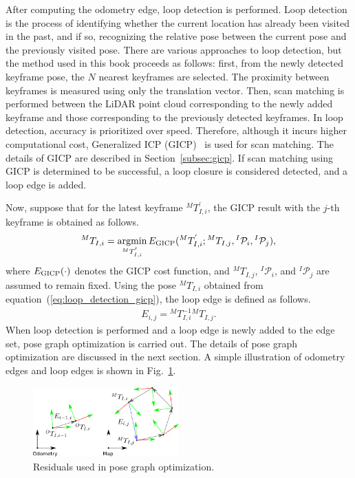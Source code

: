 After computing the odometry edge, loop detection is performed.
Loop detection is the process of identifying whether the current location has already been visited in the past, and if so, recognizing the relative pose between the current pose and the previously visited pose.
There are various approaches to loop detection, but the method used in this book proceeds as follows: first, from the newly detected keyframe pose, the $N$ nearest keyframes are selected.
The proximity between keyframes is measured using only the translation vector.
Then, scan matching is performed between the LiDAR point cloud corresponding to the newly added keyframe and those corresponding to the previously detected keyframes.
In loop detection, accuracy is prioritized over speed.
Therefore, although it incurs higher computational cost, Generalized ICP (GICP)~\cite{SegalRSS2009GICP} is used for scan matching.
The details of GICP are described in Section~\ref{subsec:gicp}.
If scan matching using GICP is determined to be successful, a loop closure is considered detected, and a loop edge is added.

Now, suppose that for the latest keyframe ${}^{M}T_{I,i}^{'}$, the GICP result with the $j$-th keyframe is obtained as follows.
%
\begin{align}
  {}^{M}T_{I, i} = \mathop{\rm argmin}\limits_{ {}^{M}T_{I, i}^{'} } E_{\rm GICP}({}^{M}T_{I, i}^{'}; {}^{M}T_{I, j}, {}^{I}\mathcal{P}_{i}, {}^{I}\mathcal{P}_{j}),
  \label{eq:loop_detection_gicp}
\end{align}
%
where $E_{\rm GICP}(\cdot)$ denotes the GICP cost function, and ${}^{M}T_{I, j}$, ${}^{I}\mathcal{P}_{i}$, and ${}^{I}\mathcal{P}_{j}$ are assumed to remain fixed.
Using the pose ${}^{M}T_{I, i}$ obtained from equation~(\ref{eq:loop_detection_gicp}), the loop edge is defined as follows.
%
\begin{align}
  E_{i, j} = {}^{M}T_{I, i}^{-1} {}^{M}T_{I, j}.
  \label{eq:loop_edge}
\end{align}
%
When loop detection is performed and a loop edge is newly added to the edge set, pose graph optimization is carried out.
The details of pose graph optimization are discussed in the next section.
A simple illustration of odometry edges and loop edges is shown in Fig.~\ref{fig:graph_slam_residuals}.

\begin{figure}[!t]
  \centering
  \includegraphics[width=0.5\textwidth]{../figs/graph_slam_residuals.pdf}
  \caption{Residuals used in pose graph optimization.}
  \label{fig:graph_slam_residuals}
\end{figure}

















